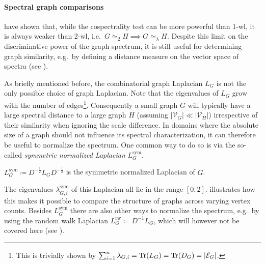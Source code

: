{\setlength{\parskip}{0pt}\paragraph{Spectral graph comparisons}
\citet{Alzaga2010} have shown that, while the cospectrality test can be more powerful than 1-\acs{wl}, it is always weaker than 2-\acs{wl}, i.e.\ $G \mathrel{\simeq_2} H \implies G \mathrel{\simeq_\lambda} H$.
Despite this limit on the discriminative power of the graph spectrum, it is still useful for determining graph similarity, e.g.\ by defining a distance measure on the vector space of spectra (see \citet{Gu2015}).}

As briefly mentioned before, the combinatorial graph Laplacian $L_G$ is not the only possible choice of graph Laplacian.
Note that the eigenvalues of $L_G$ grow with the number of edges\footnote{
	This is trivially shown by $\sum_{i=1}^n \lambda_{G,i} = \operatorname{Tr}(L_G) = \operatorname{Tr}(D_G) = |\mathcal{E}_G|$.
}.
Consequently a small graph $G$ will typically have a large spectral distance to a large graph $H$ (assuming ${|\mathcal{V}_G|} \ll {|\mathcal{V}_H|}$) irrespective of their similarity when ignoring the scale difference.
In domains where the absolute size of a graph should not influence its spectral characterization, it can therefore be useful to normalize the spectrum.
One common way to do so is via the so-called \textit{symmetric normalized Laplacian} $L^{\text{sym}}_G$.
\begin{defn}\label{defn:related:laplacian-sym}
	$L^{\text{sym}}_G \coloneqq D^{-\frac{1}{2}} L_G D^{-\frac{1}{2}}$ is the symmetric normalized Laplacian of $G$.
\end{defn}
The eigenvalues $\lambda^{\text{sym}}_{G, i}$  of this Laplacian all lie in the range $[0, 2]$.
 illustrates how this makes it possible to compare the structure of graphs across varying vertex counts.
Besides $L^{\text{sym}}_G$ there are also other ways to normalize the spectrum, e.g.\ by using the random walk Laplacian $L^{\text{rw}}_G \coloneqq D^{-1} L_G$, which will however not be covered here (see \citet{Shuman2013}).
